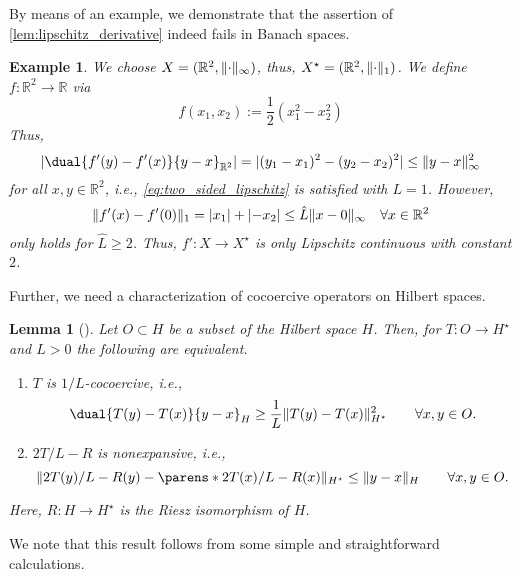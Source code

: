 \documentclass[
	english
]{scrartcl}
\numberwithin{equation}{section} %
\let\cite\parencite
\DeclarePairedDelimiter\abs{\lvert}{\rvert}
\DeclarePairedDelimiter\norm{\lVert}{\rVert}
\DeclarePairedDelimiter\parens()
\newcommand\R{\mathbb{R}}
\newcommand{\dualspace}{^\star}
\newtheorem{lemma}[theorem]{Lemma}
\newtheorem{example}[theorem]{Example}
\begin{document}
By means of an example, we demonstrate that the assertion of \cref{lem:lipschitz_derivative}
indeed fails in Banach spaces.
\begin{example}
	\label{ex:banach_lipschitz}
	We choose $X = (\R^2, \norm{\cdot}_\infty)$,
	thus, $X\dualspace = (\R^2, \norm{\cdot}_1)$.
	We define $f \colon \R^2 \to \R$ via
	\begin{equation*}
		f(x_1, x_2) := \frac12 (x_1^2 - x_2^2)
	\end{equation*}
	Thus,
	\begin{equation*}
		\abs{\dual{ f'(y) - f'(x)}{ y - x}_{\R^2}}
		=  \abs{(y_1 - x_1)^2 - (y_2 - x_2)^2}
		\le
		\norm{ y - x }_\infty^2
	\end{equation*}
	for all $x,y \in \R^2$,
	i.e., \eqref{eq:two_sided_lipschitz}
	is satisfied with $L = 1$.
	However,
	\begin{equation*}
		\norm{ f'(x) - f'(0) }_1
		= \abs{x_1} + \abs{-x_2}
		\le \hat L \norm{ x - 0 }_\infty
		\quad\forall x \in \R^2
	\end{equation*}
	only holds
	for $\hat L \ge 2$.
	Thus, $f' \colon X \to X\dualspace$ is only Lipschitz continuous with constant $2$.
\end{example}

Further, we need a characterization of cocoercive operators
on Hilbert spaces.
\begin{lemma}[\texorpdfstring{\cite[Proposition~4.2]{BauschkeCombettes2011}}{[Bauschke and Combettes, 2011, Proposition 4.2]}]
	\label{lem:cocoercive}
	Let $O \subset H$ be a subset of the Hilbert space $H$.
	Then, for $T \colon O \to H\dualspace$ and $L > 0$
	the following are equivalent.
	\begin{enumerate}
		\item
			$T$ is $1/L$-cocoercive, i.e.,
			\begin{equation*}
				\dual{T(y) - T(x)}{y - x}_H
				\ge
				\frac1L \norm{T(y) - T(x)}_{H\dualspace}^2
				\qquad\forall x,y \in O.
			\end{equation*}
		\item
			$2 T/L - R$ is nonexpansive,
			i.e.,
			\begin{equation*}
				\norm{
					2 T(y)/L - R(y)
					-
					\parens*{
						2 T(x)/L - R(x)
					}
				}_{H\dualspace}
				\le
				\norm{y - x}_H
				\qquad\forall x,y \in O.
			\end{equation*}
	\end{enumerate}
	Here, $R \colon H \to H\dualspace$ is the Riesz isomorphism of $H$.
\end{lemma}
We note that this result follows from some simple and straightforward calculations.
\end{document}
